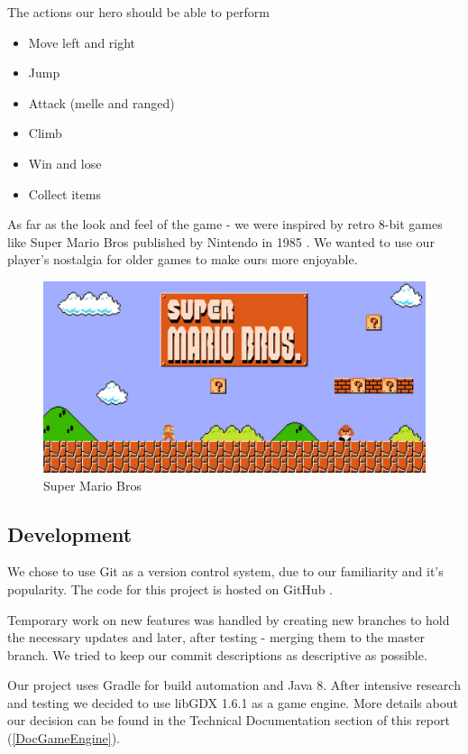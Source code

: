 \documentclass[12p]{article}
\begin{document}
The actions our hero should be able to perform
\begin{itemize}
  \item Move left and right
  \item Jump
  \item Attack (melle and ranged)
  \item Climb
  \item Win and lose
  \item Collect items
\end{itemize}

As far as the look and feel of the game - we were inspired by retro 8-bit games like Super Mario Bros published by Nintendo in 1985 \cite{SuperMarioBros}.
We wanted to use our player's nostalgia for older games to make ours more enjoyable.

\begin{figure}[ht]
  \center
  \includegraphics[width=1\textwidth]{Methodology/superMario.jpg}
  \caption{Super Mario Bros}
\end{figure}

\subsection{Development}
We chose to use Git as a version control system, due to our familiarity and it's popularity. The code for this project is hosted on GitHub \cite{GithubRepo}.

Temporary work on new features was handled by creating new branches to hold the necessary updates and later, after testing - merging them to the master branch.
We tried to keep our commit descriptions as descriptive as possible.

Our project uses Gradle for build automation and Java 8. After intensive research and testing we decided to use libGDX 1.6.1 as a game engine. More details about our decision can be found in the Technical Documentation section of this report (\ref{DocGameEngine}).
\end{document}
